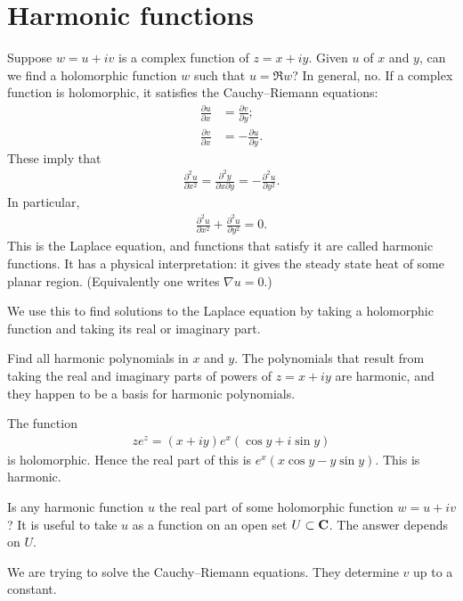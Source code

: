 \documentclass[11pt, oneside,margin=1in]{article}
\begin{document}
\section{Harmonic functions}
Suppose $w=u+iv$ is a complex function of $ z=x+iy$. Given $u$ of $x$ and $y$, can we find a holomorphic function $w$ such that $u = \Re w$? In general, no. If a complex function is holomorphic, it satisfies the Cauchy--Riemann equations:
\begin{align*}
	\frac{\partial u}{\partial x} &= \frac{\partial v}{\partial y};\\\frac{\partial v}{\partial x}& = - \frac{\partial u}{\partial y}.
\end{align*}
These imply that
\begin{align*}
	\frac{\partial^2 u}{\partial x^2} = \frac{\partial^2y}{\partial x \partial y} = -\frac{\partial^2 u}{\partial y^2}.
\end{align*}
In particular,
\begin{align*}
\frac{\partial ^2 u}{\partial x^2} + \frac{\partial^2 u}{\partial y^2} = 0.
\end{align*}
This is the Laplace equation, and functions that satisfy it are called harmonic functions. It has a physical interpretation: it gives the steady state heat of some planar region. (Equivalently one writes $\nabla u=0$.) 

We use this to find solutions to the Laplace equation by taking a holomorphic function and taking its real or imaginary part.
\begin{example}[ ]\label{}\text{}
Find all harmonic polynomials in $x$ and $y$. The polynomials that result from taking the real and imaginary parts of powers of $z = x+iy$ are harmonic, and they happen to be a basis for harmonic polynomials.
\end{example}

\begin{example}[ ]\label{}\text{}
The function
\begin{align*}
	ze^z = (x+iy)e^x (\cos y + i\sin y)
\end{align*}
is holomorphic. Hence the real part of this is $e^x(x\cos y - y\sin y)$. This is harmonic.
\end{example}

Is any harmonic function $u$ the real part of some holomorphic function $w = u+iv$? It is useful to take $u$ as a function on an open set $U\subset \mathbf C$. The answer depends on $U$. 

We are trying to solve the Cauchy--Riemann equations. They determine $v$ up to a constant. 
\end{document}
